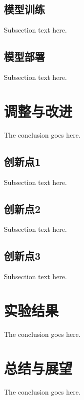 \documentclass[journal]{IEEEtran}
\begin{document}
\subsection{模型训练}
Subsection text here.

\subsection{模型部署}
Subsection text here.

\section{调整与改进}
The conclusion goes here.
\subsection{创新点1}
Subsection text here.
\subsection{创新点2}
Subsection text here.
\subsection{创新点3}
Subsection text here.

\section{实验结果}
The conclusion goes here.

\section{总结与展望}
The conclusion goes here.


%
\end{document}
